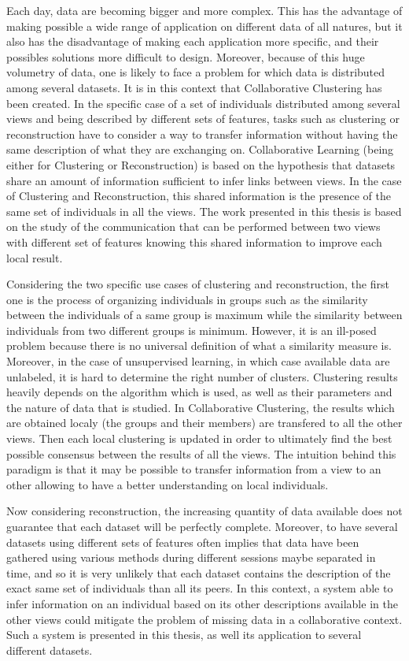 Each day, data are becoming bigger and more complex. This has the advantage of making possible a wide range of application on different data of all natures, but it also has the disadvantage of making each application more specific, and their possibles solutions more difficult to design. Moreover, because of this huge volumetry of data, one is likely to face a problem for which data is distributed among several datasets. It is in this context that Collaborative Clustering has been created. In the specific case of a set of individuals distributed among several views and being described by different sets of features, tasks such as clustering or reconstruction have to consider a way to transfer information without having the same description of what they are exchanging on. Collaborative Learning (being either for Clustering or Reconstruction) is based on the hypothesis that datasets share an amount of information sufficient to infer links between views. In the case of Clustering and Reconstruction, this shared information is the presence of the same set of individuals in all the views. The work presented in this thesis is based on the study of the communication that can be performed between two views with different set of features knowing this shared information to improve each local result.

Considering the two specific use cases of clustering and reconstruction, the first one is the process of organizing individuals in groups such as the similarity between the individuals of a same group is maximum while the similarity between individuals from two different groups is minimum. However, it is an ill-posed problem because there is no universal definition of what a similarity measure is. Moreover, in the case of unsupervised learning, in which case available data are unlabeled, it is hard to determine the right number of clusters. Clustering results heavily depends on the algorithm which is used, as well as their parameters and the nature of data that is studied. In Collaborative Clustering, the results which are obtained localy (the groups and their members) are transfered to all the other views. Then each local clustering is updated in order to ultimately find the best possible consensus between the results of all the views. The intuition behind this paradigm is that it may be possible to transfer information from a view to an other allowing to have a better understanding on local individuals.

Now considering reconstruction, the increasing quantity of data available does not guarantee that each dataset will be perfectly complete. Moreover, to have several datasets using different sets of features often implies that data have been gathered using various methods during different sessions maybe separated in time, and so it is very unlikely that each dataset contains the description of the exact same set of individuals than all its peers. In this context, a system able to infer information on an individual based on its other descriptions available in the other views could mitigate the problem of missing data in a collaborative context. Such a system is presented in this thesis, as well its application to several different datasets.

